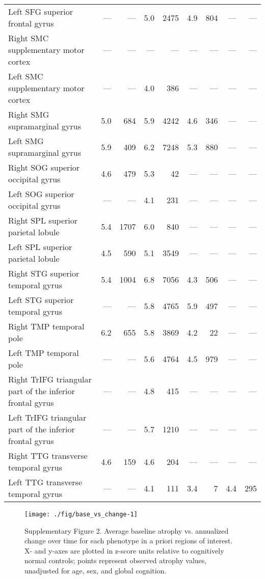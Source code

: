 \documentclass[]{article}
\begin{document}
\begin{table}[ht]
{\begin{tabular}{lrrrrrrrr}
  Left SFG   superior frontal gyrus & --- & --- & 5.0 & 2475 & 4.9 & 804 & --- & --- \\ 
  Right SMC   supplementary motor cortex & --- & --- & --- & --- & --- & --- & --- & --- \\ 
  Left SMC   supplementary motor cortex & --- & --- & 4.0 & 386 & --- & --- & --- & --- \\ 
  Right SMG   supramarginal gyrus & 5.0 & 684 & 5.9 & 4242 & 4.6 & 346 & --- & --- \\ 
  Left SMG   supramarginal gyrus & 5.9 & 409 & 6.2 & 7248 & 5.3 & 880 & --- & --- \\ 
  Right SOG   superior occipital gyrus & 4.6 & 479 & 5.3 & 42 & --- & --- & --- & --- \\ 
  Left SOG   superior occipital gyrus & --- & --- & 4.1 & 231 & --- & --- & --- & --- \\ 
  Right SPL   superior parietal lobule & 5.4 & 1707 & 6.0 & 840 & --- & --- & --- & --- \\ 
  Left SPL   superior parietal lobule & 4.5 & 590 & 5.1 & 3549 & --- & --- & --- & --- \\ 
  Right STG   superior temporal gyrus & 5.4 & 1004 & 6.8 & 7056 & 4.3 & 506 & --- & --- \\ 
  Left STG   superior temporal gyrus & --- & --- & 5.8 & 4765 & 5.9 & 497 & --- & --- \\ 
  Right TMP   temporal pole & 6.2 & 655 & 5.8 & 3869 & 4.2 & 22 & --- & --- \\ 
  Left TMP   temporal pole & --- & --- & 5.6 & 4764 & 4.5 & 979 & --- & --- \\ 
  Right TrIFG triangular part of the inferior frontal gyrus & --- & --- & 4.8 & 415 & --- & --- & --- & --- \\ 
  Left TrIFG triangular part of the inferior frontal gyrus & --- & --- & 5.7 & 1210 & --- & --- & --- & --- \\ 
  Right TTG   transverse temporal gyrus & 4.6 & 159 & 4.6 & 204 & --- & --- & --- & --- \\ 
  Left TTG   transverse temporal gyrus & --- & --- & 4.1 & 111 & 3.4 & 7 & 4.4 & 295 \\ 
   \hline
\end{tabular}
}
\end{table}

\begin{figure}

{\centering \texttt{[image: ./fig/base\_vs\_change-1]} 

}

\caption{Supplementary Figure 2. Average baseline atrophy vs. annualized change over time for each phenotype in a priori regions of interest. X- and y-axes are plotted in z-score units relative to cognitively normal controls; points represent observed atrophy values, unadjusted for age, sex, and global cognition.}\label{fig:base_vs_change}
\end{figure}
\end{document}
